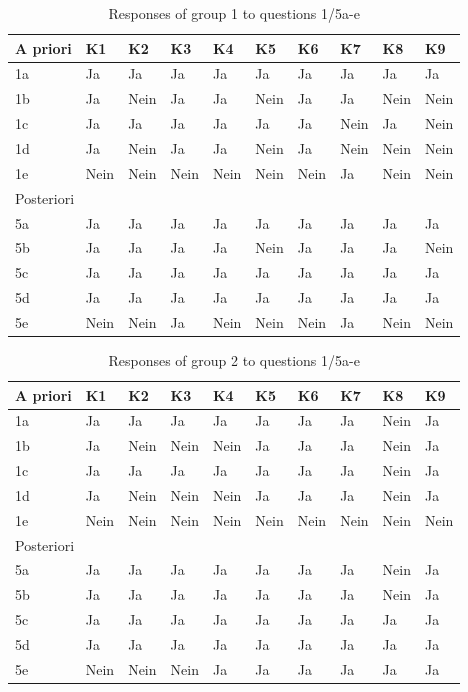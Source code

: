 \begin{table}[H]
    \centering
    \begin{tabular}{l | l  l  l  l  l  l  l  l  l  }
	A priori & K1 & K2 & K3 & K4 & K5 & K6 & K7 & K8 & K9 \\ \hline
	1a & Ja & Ja & Ja & Ja & Ja & Ja & Ja & Ja & Ja \\ %
	1b & Ja & Nein & Ja & Ja & Nein & Ja & Ja & Nein & Nein \\ %
	1c & Ja & Ja & Ja & Ja & Ja & Ja & Nein & Ja & Nein \\ %
	1d & Ja & Nein & Ja & Ja & Nein & Ja & Nein & Nein & Nein \\ %
	1e & Nein & Nein & Nein & Nein & Nein & Nein & Ja & Nein & Nein \\ %
	\multicolumn{10}{l}{Posteriori}  \\ \hline
	5a & Ja & Ja & Ja & Ja & Ja & Ja & Ja & Ja & Ja \\ %
	5b & Ja & Ja & Ja & Ja & Nein & Ja & Ja & Ja & Nein \\ %
	5c & Ja & Ja & Ja & Ja & Ja & Ja & Ja & Ja & Ja \\ %
	5d & Ja & Ja & Ja & Ja & Ja & Ja & Ja & Ja & Ja \\ %
	5e & Nein & Nein & Ja & Nein & Nein & Nein & Ja & Nein & Nein \\ %
    \end{tabular}
    \caption{Responses of group 1 to questions 1/5a-e}
    \label{tab:Video15}
\end{table}

\begin{table}[H]
    \centering
    \begin{tabular}{ l | l  l  l  l  l  l  l  l  l  }
    A priori & K1 & K2 & K3 & K4 & K5 & K6 & K7 & K8 & K9 \\ \hline
	1a & Ja & Ja & Ja & Ja & Ja & Ja & Ja & Nein & Ja \\ 
	1b & Ja & Nein & Nein & Nein & Ja & Ja & Ja & Nein & Ja \\ 
	1c & Ja & Ja & Ja & Ja & Ja & Ja & Ja & Nein & Ja \\ 
	1d & Ja & Nein & Nein & Nein & Ja & Ja & Ja & Nein & Ja \\ 
	1e & Nein & Nein & Nein & Nein & Nein & Nein & Nein & Nein & Nein \\ 
	\multicolumn{10}{l}{Posteriori}  \\ \hline
	5a & Ja & Ja & Ja & Ja & Ja & Ja & Ja & Nein & Ja \\ 
	5b & Ja & Ja & Ja & Ja & Ja & Ja & Ja & Nein & Ja \\
	5c & Ja & Ja & Ja & Ja & Ja & Ja & Ja & Ja & Ja \\ 
	5d & Ja & Ja & Ja & Ja & Ja & Ja & Ja & Ja & Ja \\
	5e & Nein & Nein & Nein & Ja & Ja & Ja & Ja & Ja & Ja \\
    \end{tabular}
    \caption{Responses of group 2 to questions 1/5a-e}
    \label{tab:Tutorial15}
\end{table}


